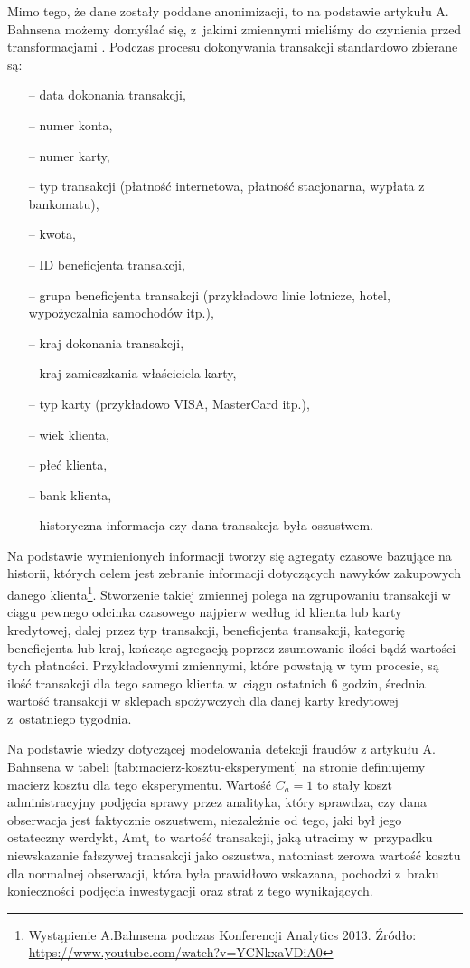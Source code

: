 \documentclass[inzynierska]{pwr_wmat_praca_dyplomowa}
\theoremstyle{plain}
\numberwithin{theorem}{chapter}
\theoremstyle{definition}
\numberwithin{theorem}{chapter}
\begin{document}
Mimo tego, że dane zostały poddane anonimizacji, to na podstawie artykułu A. Bahnsena możemy domyślać się, z~jakimi zmiennymi mieliśmy do czynienia przed transformacjami \cite{CSCCFD}. Podczas procesu dokonywania transakcji standardowo zbierane są: 
\begin{itemize}
	\item[--] data dokonania transakcji, 
	\item[--] numer konta,
	\item[--] numer karty,
	\item[--] typ transakcji (płatność internetowa, płatność stacjonarna, wypłata z bankomatu),
	\item[--] kwota, 
	\item[--] ID beneficjenta transakcji,
	\item[--] grupa beneficjenta transakcji (przykładowo linie lotnicze, hotel, wypożyczalnia samochodów itp.), 
	\item[--] kraj dokonania transakcji,
	\item[--] kraj zamieszkania właściciela karty,
	\item[--] typ karty (przykładowo VISA, MasterCard itp.),
	\item[--] wiek klienta, 
 	\item[--] płeć klienta,
	\item[--] bank klienta,
	\item[--] historyczna informacja czy dana transakcja była oszustwem.
\end{itemize}
\noindent Na podstawie wymienionych informacji tworzy się agregaty czasowe bazujące na historii, których celem jest zebranie informacji dotyczących nawyków zakupowych danego klienta\footnote{Wystąpienie A.Bahnsena podczas Konferencji Analytics 2013. Źródło: \url{https://www.youtube.com/watch?v=YCNkxaVDiA0}}. Stworzenie takiej zmiennej polega na zgrupowaniu transakcji w ciągu pewnego odcinka czasowego najpierw według id klienta lub karty kredytowej, dalej przez typ transakcji, beneficjenta transakcji, kategorię beneficjenta lub kraj, kończąc agregacją poprzez zsumowanie ilości bądź wartości tych płatności. Przykładowymi zmiennymi, które powstają w tym procesie, są ilość transakcji dla tego samego klienta w~ciągu ostatnich 6 godzin, średnia wartość transakcji w sklepach spożywczych dla danej karty kredytowej z~ostatniego tygodnia. 

Na podstawie wiedzy dotyczącej modelowania detekcji fraudów z artykułu A. Bahnsena \cite{alej2015ensemble} w tabeli \ref{tab:macierz-kosztu-eksperyment} na stronie \pageref{tab:macierz-kosztu-eksperyment} definiujemy macierz kosztu dla tego eksperymentu. Wartość $C_a = 1$ to stały koszt administracyjny podjęcia sprawy przez analityka, który sprawdza, czy dana obserwacja jest faktycznie oszustwem, niezależnie od tego, jaki był jego ostateczny werdykt, $\text{Amt}_i$ to wartość transakcji, jaką utracimy w~przypadku niewskazanie fałszywej transakcji jako oszustwa, natomiast zerowa wartość kosztu dla normalnej obserwacji, która była prawidłowo wskazana, pochodzi z~braku konieczności podjęcia inwestygacji oraz strat z tego wynikających.
\end{document}
